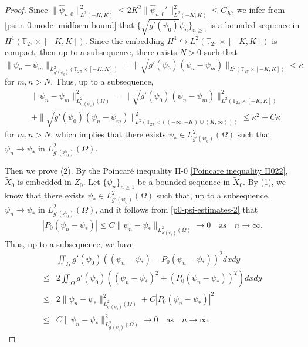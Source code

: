 \documentclass[1 [leqno, 11pt]{amsart}
\numberwithin{equation}{section}
\begin{document}
\begin{CJK*}{GBK}{song}
\begin{proof}
Since $\|\widehat{\psi}_{n,0}\|_{L^2(-K,K)}^2\leq 2K^2\|\widehat{\psi}_{n,0}'\|_{L^2(-K,K)}^2\leq C_K$, we infer from \eqref{psi-n-0-mode-unidform bound} that
$\{\sqrt{g'(\psi_0)}\psi_n\}_{n\geq1}$ is a  bounded sequence in $H^1(\mathbb{T}_{2\pi} \times [-K,K])$. Since the embedding $H^1\hookrightarrow L^2(\mathbb{T}_{2\pi} \times [-K,K])$ is compact, then up to a subsequence, there exists $N>0$ such that $\|\psi_n -\psi_m\|_{L^2_{g'(\psi_0)}(\mathbb{T}_{2\pi} \times [-K,K])}=\|\sqrt{g'(\psi_0)}(\psi_n-\psi_m)\|_{L^2(\mathbb{T}_{2\pi} \times [-K,K])}<\kappa$ for $m,n>N$. Thus, up to a subsequence,
\begin{align*}
& \|\psi_n -\psi_m\|_{L^2_{g'(\psi_0)}(\Omega)}^2 = \|\sqrt{g'(\psi_0)}(\psi_n-\psi_m)\|_{L^2(\mathbb{T}_{2\pi} \times [-K,K])}^2  \\ &+\|\sqrt{g'(\psi_0)}(\psi_n-\psi_m)\|_{L^2(\mathbb{T}_{2\pi} \times ((-\infty, -K)\cup(K,\infty)))}^2   \leq \kappa^2+ C \kappa
\end{align*}
for $m,n>N$, which implies that there exists $\psi_* \in L^2_{g'(\psi_0)}(\Omega)$ such that $\psi_n\rightarrow\psi_*$ in $ L^2_{g'(\psi_0)}(\Omega)$.

Then we prove (2).
By the Poincar\'e inequality II-$0$ \eqref{Poincare inequality II022}, $\tilde X_0$ is embedded in $Z_0$. Let $\{\psi_n\}_{n\geq1}$ be a bounded sequence in $\tilde{X}_0$. By (1), we know that there exists $\psi_* \in L^2_{g'(\psi_0)}(\Omega)$ such that, up to a subsequence, $\psi_n \rightarrow \psi_*$ in $L^2_{g'(\psi_0)}(\Omega)$, and  it follows from \eqref{p0-psi-estimates-2} that
\begin{align*}
|P_0( \psi_n - \psi_*)| \leq C \|\psi_n - \psi_*\|_{L^2_{g'(\psi_0)}(\Omega)} \rightarrow 0\quad \text{as}\quad n \rightarrow  \infty.
\end{align*}
Thus, up to a subsequence, we have
\begin{align*}
&\iint_{\Omega} g'(\psi_0) \left((\psi_n - \psi_*) - P_0 (\psi_n -  \psi_*)\right)^2 dxdy \\
\leq & 2 \iint_{\Omega} g'(\psi_0) \left((\psi_n - \psi_*)^2 + \left(P_0 (\psi_n -  \psi_*)\right)^2\right) dxdy \\
\leq & 2\|\psi_n - \psi_*\|_{L^2_{g'(\psi_0)}(\Omega)}^2 + C|P_0( \psi_n -  \psi_*)|^2 \\
\leq & C \|\psi_n - \psi_*\|_{L^2_{g'(\psi_0)}(\Omega)}^2 \rightarrow 0 \quad\text{as}\quad n \rightarrow  \infty.
\end{align*}
\end{proof}



\end{CJK*}
\end{document}
